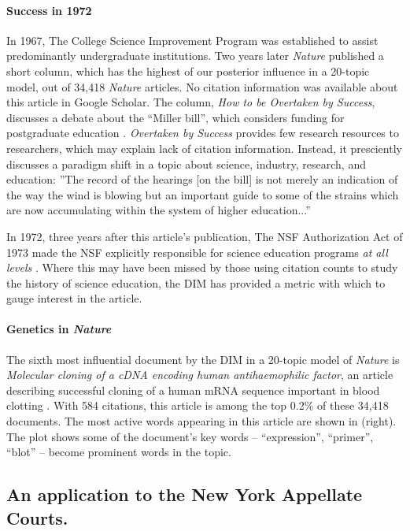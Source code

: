\paragraph{Success in 1972}
In 1967, The College Science Improvement Program was established to
assist predominantly undergraduate institutions.  Two years later
\emph{Nature} published a short column, which has the highest of our
posterior influence in a 20-topic model, out of 34,418 \emph{Nature}
articles.  No citation information was available about this article in
Google Scholar. The column, \emph{How to be Overtaken by Success},
discusses a debate about the ``Miller bill'', which considers funding
for postgraduate education
\cite{Nature.success:1969}. \textit{Overtaken by Success} provides few
research resources to researchers, which may explain lack of citation
information. Instead, it presciently discusses a paradigm shift in a
topic about science, industry, research, and education: ''The record
of the hearings [on the bill] is not merely an indication of the way
the wind is blowing but an important guide to some of the strains
which are now accumulating within the system of higher education...''

In 1972, three years after this article's publication, The NSF
Authorization Act of 1973 made the NSF explicitly responsible for
science education programs \emph{at all levels}
\cite{NSF.website:2010}.  Where this may have been missed by those
using citation counts to study the history of science education, the
DIM has provided a metric with which to gauge interest in the article.


\paragraph{Genetics in \emph{Nature}}
The sixth most influential document by the DIM in a 20-topic model of
\emph{Nature} is \emph{Molecular cloning of a cDNA encoding human
  antihaemophilic factor}, an article describing successful
cloning of a human mRNA sequence important in blood clotting
\cite{toole:1984}.  With 584 citations, this article is among the top
0.2\% of these 34,418 documents.  The most active words
appearing in this article are shown in
 (right).  The plot shows some of the
document's key words -- ``expression'', ``primer'', ``blot'' -- become
prominent words in the topic.

\subsection{An application to the New York Appellate Courts.}

